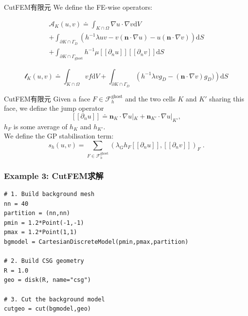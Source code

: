 \documentclass[lang=en,aspectratio=43,theme=default,logo=on]{simplebeamer}
\begin{document}
\begin{frame}{CutFEM有限元}
    We define the FE-wise operators:

    \begin{gather*}%
        \mathcal{A}_K(u,v)\doteq\int_{K\cap \Omega }\nabla u \cdot \nabla v \mathrm{d}V \\
        +\int_{\partial K\cap \Gamma_D}\left(h^{-1}\lambda uv -v(\mathbf{n}\cdot \nabla u)-u(\mathbf{n}\cdot \nabla v) \right) \mathrm{d}S\\
        +\int_{\partial K\cap \Gamma_\mathrm{ghost}}h^{-1}\mu [\![\partial_nu]\!] [\![\partial_nv]\!] \mathrm{d}S
    \end{gather*}

    \begin{equation*}
        \mathcal{l}_K(u,v)\doteq \int_{K\cap \Omega }vf \mathrm{d}V + \int_{\partial K\cap \Gamma_D } \left(h^{-1}\lambda vg_D -(\mathbf{n} \cdot \nabla v)g_D)\right) \mathrm{d}S
    \end{equation*}

\end{frame}

\begin{frame}{CutFEM有限元}
    Given a face $F \in \mathcal{F}^{\mathrm{ghost}}_h$ and the two cells $K$ and $K'$ sharing this face, we define the jump operator
    \[
    [\![\partial_nu]\!] \doteq \mathbf{n}_K \cdot \nabla u|_K + \mathbf{n}_{K'} \cdot \nabla u|_{K'},
    \]
    $h_F$ is some average of $h_K$ and $h_{K'}$. \\
    We define the GP stabilisation term:
    \begin{equation*}
        s_h(u,v) = \sum_{F \in \mathcal{F}^{\mathrm{ghost}}_h}{ \left( \lambda_G h_F [\![\partial_nu]\!], [\![\partial_nv]\!] \right)_F}\;.
    \end{equation*}
\end{frame}

\begin{frame}[fragile]
    \frametitle{Example 3: CutFEM求解}
    \begin{verbatim}
# 1. Build background mesh
nn = 40
partition = (nn,nn)
pmin = 1.2*Point(-1,-1)
pmax = 1.2*Point(1,1)
bgmodel = CartesianDiscreteModel(pmin,pmax,partition)

# 2. Build CSG geometry
R = 1.0
geo = disk(R, name="csg")

# 3. Cut the background model
cutgeo = cut(bgmodel,geo)
    \end{verbatim}
\end{frame}
\end{document}
